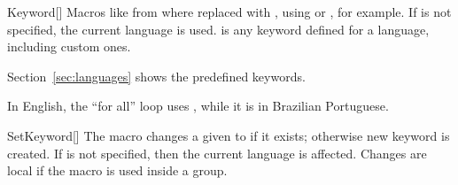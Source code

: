 \documentclass[a4paper, 11pt]{article}
\begin{document}
%
%
%
%
\begin{macro}{Keyword}[]
    Macros like  from  where replaced with , using  or , for example.
    If  is not specified, the current language is used.  is any keyword defined for a language, including custom ones.

    Section~\ref{sec:languages} shows the predefined keywords.

    \begin{tcblisting}{}
        In English, the ``for all'' loop uses , while it is  in Brazilian Portuguese.
    \end{tcblisting}
\end{macro}

\begin{macro}{SetKeyword}[]
    The macro  changes a given  to  if it exists; otherwise new keyword is created.
    If  is not specified, then the current language is affected. Changes are local if the macro is used inside a group.
\end{macro}



%
%
%
%
%
\clearpage
\printindex
\end{document}

